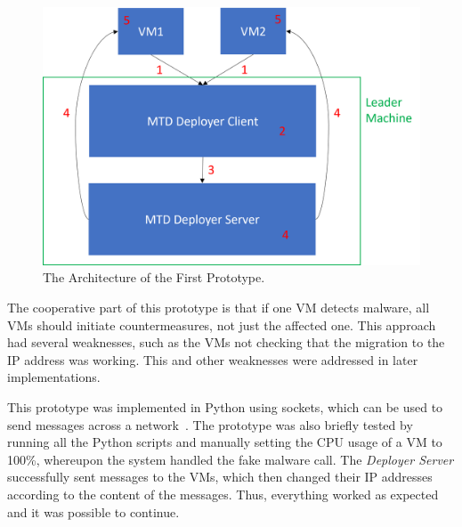 \begin{figure}[tph]
\includegraphics[scale=0.8]{assets/firstArchitecture.png}
\centering
\caption{The Architecture of the First Prototype.}
    \label{graphic:firstArchitecture}
\end{figure}

The cooperative part of this prototype is that if one VM detects malware, all VMs should initiate countermeasures, not just the affected one. This approach had several weaknesses, such as the VMs not checking that the migration to the IP address was working. This and other weaknesses were addressed in later implementations. 

This prototype was implemented in Python using sockets, which can be used to send messages across a network~\cite{website:realPythonSockets}. The prototype was also briefly tested by running all the Python scripts and manually setting the CPU usage of a VM to 100\%, whereupon the system handled the fake malware call. The \textit{Deployer Server} successfully sent messages to the VMs, which then changed their IP addresses according to the content of the messages. Thus, everything worked as expected and it was possible to continue. 


